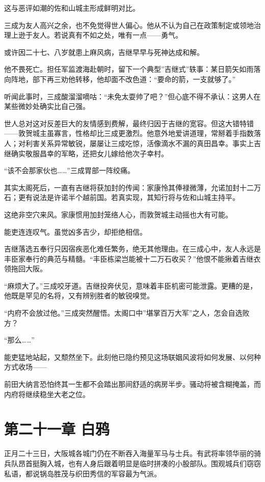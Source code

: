 \documentclass[
]{article}
\begin{document}
这与恶评如潮的佐和山城主形成鲜明对比。

三成为友人高兴之余，也不免觉得世人偏心。他从不认为自己在政策制定或领地治理上逊于友人。若说真有不如之处，唯有一点------勇气。

或许因二十七、八岁就患上麻风病，吉继早早与死神达成和解。

他不畏死亡。担任军监渡海赴朝时，留下一个典型''吉继式''轶事：某日箭矢如雨落向阵地，部下再三劝他转移，他却面不改色道：``要命的箭，一支就够了。''

听闻此事时，三成酸溜溜嘀咕：``未免太耍帅了吧？''但心底不得不承认：这男人在某些微妙处确实比自己强。

世人总对这对反差巨大的友情感到费解，最终归因于吉继的宽容。但这大错特错------敦贺城主虽寡言，性格却比三成更激烈。他意外地爱讲道理，常掰着手指数落人；对利害关系异常敏锐，屡屡让三成吃惊，活像滴水不漏的真田昌幸。事实上吉继确实敬服昌幸的军略，还把女儿嫁给他次子幸村。

``该不会那家伙也\ldots\ldots{}''三成胃部一阵绞痛。

其实太阁死后，一直有吉继将获加封的传闻：家康怜其俸禄微薄，允诺加封十二万石；更有说法是许诺半个越前国。若真实现，其知行将与佐和山城主持平。

这绝非空穴来风。家康惯用加封笼络人心，而敦贺城主动摇也大有可能。

能吏连连叹气。虽觉凶多吉少，却拒绝相信。

吉继落选五奉行只因宿疾恶化难任繁务，绝无其他理由。在三成心中，友人永远是丰臣家奉行的典范与精髓。``丰臣栋梁岂能被十二万石收买？''他恨不能揪着吉继衣领拖回大阪。

``麻烦大了。''三成咬牙道。吉继投奔伏见，意味着丰臣机密可能泄露。更糟的是，他既是罕见的名将，又有辨别胜者的敏锐嗅觉。

``内府不会放过他。''三成突然醒悟。太阁口中''堪掌百万大军''之人，怎会自选败方？

``那么\ldots\ldots{}''

能吏猛地站起，又颓然坐下。此刻他已隐约预见这场联姻风波将如何发展、以何种方式收场------

前田大纳言恐怕终其一生都不会踏出那间舒适的病房半步。骚动将被含糊掩盖，而内府将继续稳坐大老之位。

\section*{第二十一章 白鸦}\label{ux7b2cux4e8cux5341ux4e00ux7ae0-ux767dux9e26}

正月二十三日，大阪城各城门仍在不断吞入海量军马与士兵。有武将率领华丽的骑兵队昂首挺胸入城，也有人身后跟着明显是临时拼凑的小股部队。围观城兵们窃窃私语，都说锅岛胜茂与织田秀信的军容最为气派。
\end{document}
